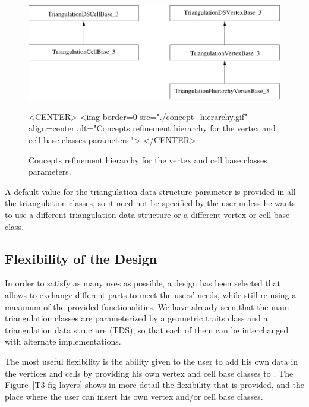 \begin{figure}[htbp]
\begin{ccTexOnly}
\begin{center}
\includegraphics[width=13cm]{Triangulation_3/concept_hierarchy}
\end{center}
\end{ccTexOnly}
\begin{ccHtmlOnly}
<CENTER>
<img border=0 src="./concept_hierarchy.gif" align=center
 alt="Concepts refinement hierarchy for the vertex and cell base classes
parameters.">
</CENTER>
\end{ccHtmlOnly}
\caption{Concepts refinement hierarchy for the vertex and cell base classes
parameters.
\label{T3-concept-hierarchy}}
\end{figure}

A default value for the triangulation data structure parameter is provided in
all the triangulation classes, so it need not be specified by the user unless
he wants to use a different triangulation data structure or a different vertex
or cell base class.

\subsection{Flexibility of the Design}

In order to satisfy as many uses as possible, a design has been selected that
allows to exchange different parts to meet the users' needs, while still
re-using a maximum of the provided functionalities.  We have already seen that
the main triangulation classes are parameterized by a geometric traits class
and a triangulation data structure (TDS), so that each of them can be
interchanged with alternate implementations.

The most useful flexibility is the ability given to the user to add his own
data in the vertices and cells by providing his own vertex and cell base
classes to .  The
Figure~\ref{T3-fig-layers} shows in more detail the flexibility that is
provided, and the place where the user can insert his own vertex and/or cell
base classes.

